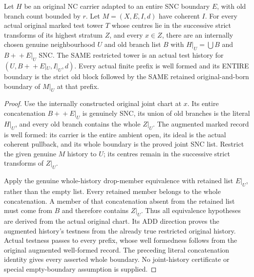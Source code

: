 \begin{theorem}
\label{hir:nc-highest-joint-retained-boundary-histories}
\leanok
Let $H$ be an original NC carrier adapted to an entire SNC boundary $E$,
with old branch count bounded by $r$. Let $M=(X,E,I,d)$ have coherent $I$.
For every actual original marked test tower $T$ whose centres lie in the
successive strict transforms of its highest stratum $Z$, and every $x\in Z$,
there are an internally chosen genuine neighbourhood $U$ and old branch list
$B$ with $H|_U=\bigcup B$ and $B+\!+E|_U$ SNC. The SAME restricted tower is
an actual test history for $(U,B+\!+E|_U,I|_U,d)$. Every actual finite prefix
is well formed and its ENTIRE boundary is the strict old block followed by
the SAME retained original-and-born boundary of $M|_U$ at that prefix.
\end{theorem}
\begin{proof}
Use the internally constructed original joint chart at $x$. Its entire
concatenation $B+\!+E|_U$ is genuinely SNC, its union of old branches is the
literal $H|_U$, and every old branch contains the whole $Z|_U$. The augmented
marked record is well formed: its carrier is the entire ambient open,
its ideal is the actual coherent pullback, and its whole boundary is the
proved joint SNC list. Restrict the given genuine $M$ history to $U$; its
centres remain in the successive strict transforms of $Z|_U$.

Apply the genuine whole-history drop-member equivalence with retained list
$E|_U$, rather than the empty list. Every retained member belongs to the
whole concatenation. A member of that concatenation absent from the retained
list must come from $B$ and therefore contains $Z|_U$. Thus all equivalence
hypotheses are derived from the actual original chart. Its ADD direction
proves the augmented history's testness from the already true restricted
original history. Actual testness passes to every prefix, whose well
formedness follows from the original augmented well-formed record. The
preceding literal concatenation identity gives every asserted whole boundary.
No joint-history certificate or special empty-boundary assumption is supplied.
\end{proof}

